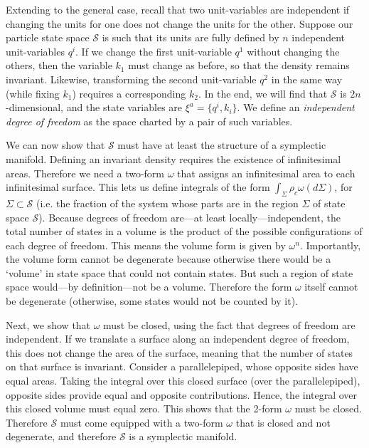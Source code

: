 \documentclass[12pt, english, twoside]{article} %
\begin{document}
Extending to the general case, recall that two unit-variables are independent if changing the units for one does not change the units for the other. Suppose our particle state space $\mathcal{S}$ is such that its units are fully defined by $n$ independent unit-variables $q^i$. If we change the first unit-variable $q^1$ without changing the others, then the variable $k_1$ must change as before, so that the density remains invariant. Likewise, transforming the second unit-variable $q^2$ in the same way (while fixing $k_1$) requires a corresponding $k_2$. In the end, we will find that $\mathcal{S}$ is $2n$-dimensional, and the state variables are $\xi^a = \{ q^i, k_i \}$. We define an \textit{independent degree of freedom} as the space charted by a pair of such variables.

We can now show that $\mathcal{S}$ must have at least the structure of a symplectic manifold. Defining an invariant density requires the existence of infinitesimal areas. Therefore we need a two-form $\omega$ that assigns an infinitesimal area to each infinitesimal surface. This lets us define integrals of the form $\int_{\Sigma} \rho_c \omega(d\Sigma)$, for $\Sigma \subset \mathcal{S}$ (i.e. the fraction of the system whose parts are in the region $\Sigma$ of state space $\mathcal{S}$). Because degrees of freedom are---at least locally---independent, the total number of states in a volume is the product of the possible configurations of each degree of freedom. This means the volume form is given by $\omega^n$. Importantly, the volume form cannot be degenerate because otherwise there would be a `volume' in state space that could not contain states. But such a region of state space would---by definition---not be a volume. Therefore the form $\omega$ itself cannot be degenerate (otherwise, some states would not be counted by it). 

Next, we show that $\omega$ must be closed, using the fact that degrees of freedom are independent. If we translate a surface along an independent degree of freedom, this does not change the area of the surface, meaning that the number of states on that surface is invariant. Consider a parallelepiped, whose opposite sides have equal areas. Taking the integral over this closed surface (over the parallelepiped), opposite sides provide equal and opposite contributions. Hence, the integral over this closed volume must equal zero. This shows that the 2-form $\omega$ must be closed. Therefore $\mathcal{S}$ must come equipped with a two-form $\omega$ that is closed and not degenerate, and therefore $\mathcal{S}$ is a symplectic manifold.
\end{document}
